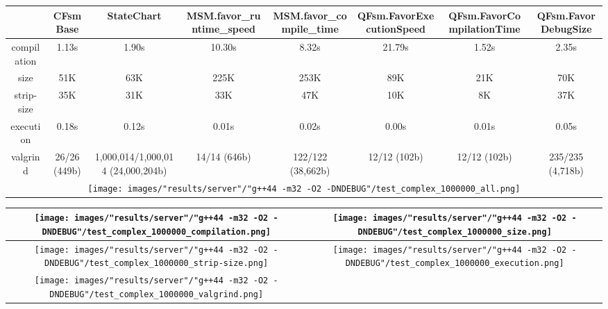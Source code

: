 \begin{landscape}
\begin{table}
\caption{"server" [54c084f], g++44 -m32 -O2 -DNDEBUG/test complex 1000000}
\centering
\begin{longtable}{| c | c |c |c |c |c |c |c |}
\hline
& CFsmBase& StateChart& MSM.favor\_runtime\_speed& MSM.favor\_compile\_time& QFsm.FavorExecutionSpeed& QFsm.FavorCompilationTime& QFsm.FavorDebugSize\\
\hline
compilation & 1.13s & 1.90s & 10.30s & 8.32s & 21.79s & 1.52s & 2.35s\\
\hline
size & 51K & 63K & 225K & 253K & 89K & 21K & 70K\\
\hline
strip-size & 35K & 31K & 33K & 47K & 10K & 8K & 37K\\
\hline
execution & 0.18s & 0.12s & 0.01s & 0.02s & 0.00s & 0.01s & 0.05s\\
\hline
valgrind & 26/26 (449b) & 1,000,014/1,000,014 (24,000,204b) & 14/14 (646b) & 122/122 (38,662b) & 12/12 (102b) & 12/12 (102b) & 235/235 (4,718b)\\
\hline
\multicolumn{8}{|c|}{\texttt{[image: images/"results/server"/"g++44 -m32 -O2 -DNDEBUG"/test\_complex\_1000000\_all.png]}}\\
\hline
\end{longtable}
\end{table}
\end{landscape}
\newpage
\begin{table}
\centering
\begin{longtable}{| c | c |}
\hline
\texttt{[image: images/"results/server"/"g++44 -m32 -O2 -DNDEBUG"/test\_complex\_1000000\_compilation.png]}& \texttt{[image: images/"results/server"/"g++44 -m32 -O2 -DNDEBUG"/test\_complex\_1000000\_size.png]}\\
\hline
\texttt{[image: images/"results/server"/"g++44 -m32 -O2 -DNDEBUG"/test\_complex\_1000000\_strip-size.png]}& \texttt{[image: images/"results/server"/"g++44 -m32 -O2 -DNDEBUG"/test\_complex\_1000000\_execution.png]}\\
\hline
\texttt{[image: images/"results/server"/"g++44 -m32 -O2 -DNDEBUG"/test\_complex\_1000000\_valgrind.png]}& \\ \hline
\end{longtable}
\end{table}
